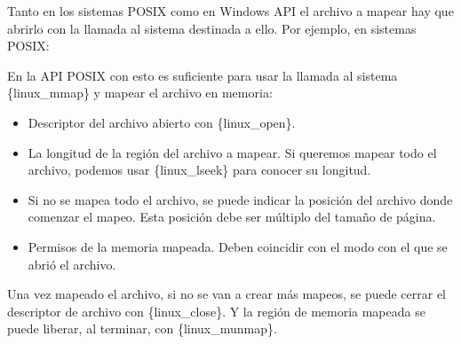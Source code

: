 Tanto en los sistemas POSIX como en Windows API el archivo a mapear hay
que abrirlo con la llamada al sistema destinada a ello. Por ejemplo, en
sistemas POSIX:

\begin{Shaded}
\begin{Highlighting}[]
\OperatorTok{=}\OperatorTok{(} \OperatorTok{,}\OperatorTok{);}
\end{Highlighting}
\end{Shaded}

En la API POSIX con esto es suficiente para usar la llamada al sistema
\{linux\_mmap\} y mapear el archivo en memoria:

\begin{Shaded}
\begin{Highlighting}[]
\OperatorTok{=}\OperatorTok{(}\OperatorTok{,} \OperatorTok{,}\OperatorTok{);}
\OperatorTok{*}\OperatorTok{=}\OperatorTok{(}
\OperatorTok{,}
\OperatorTok{,}
\OperatorTok{,}
\OperatorTok{,}
\OperatorTok{,}
\OperatorTok{);}
\end{Highlighting}
\end{Shaded}

\begin{itemize}
\item
  Descriptor del archivo abierto con \{linux\_open\}.
\item
  La longitud de la región del archivo a mapear. Si queremos mapear todo
  el archivo, podemos usar \{linux\_lseek\} para conocer su longitud.
\item
  Si no se mapea todo el archivo, se puede indicar la posición del
  archivo donde comenzar el mapeo. Esta posición debe ser múltiplo del
  tamaño de página.
\item
  Permisos de la memoria mapeada. Deben coincidir con el modo con el que
  se abrió el archivo.
\end{itemize}

Una vez mapeado el archivo, si no se van a crear más mapeos, se puede
cerrar el descriptor de archivo con \{linux\_close\}. Y la región de
memoria mapeada se puede liberar, al terminar, con \{linux\_munmap\}.


